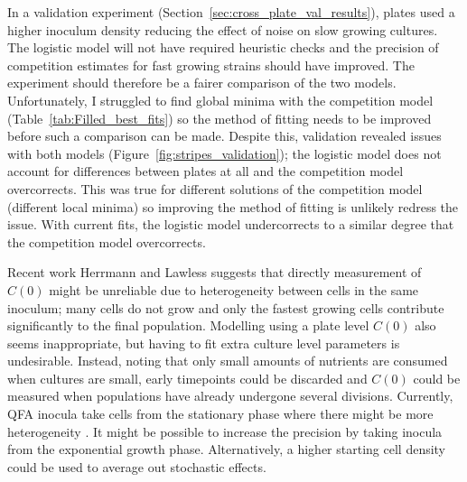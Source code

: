 In a validation experiment
(Section~\ref{sec:cross_plate_val_results}), plates used a higher
inoculum density reducing the effect of noise on slow growing
cultures. The logistic model will not have required heuristic checks
and the precision of competition estimates for fast growing strains
should have improved. The experiment should therefore be a fairer
comparison of the two models. Unfortunately, I struggled to find
global minima with the competition model
(Table~\ref{tab:Filled_best_fits}) so the method of fitting needs to
be improved before such a comparison can be made. Despite this,
validation revealed issues with both models
(Figure~\ref{fig:stripes_validation}); the logistic model does not
account for differences between plates at all and the competition
model overcorrects. This was true for different solutions of the
competition model (different local minima) so improving the method of
fitting is unlikely redress the issue. With current fits, the logistic
model undercorrects to a similar degree that the competition model
overcorrects.


Recent work Herrmann and Lawless suggests that directly measurement of
\(C(0)\) might be unreliable due to heterogeneity between cells in the
same inoculum; many cells do not grow and only the fastest growing
cells contribute significantly to the final population. Modelling
using a plate level \(C(0)\) also seems inappropriate, but having to
fit extra culture level parameters is undesirable. Instead, noting
that only small amounts of nutrients are consumed when cultures are
small, early timepoints could be discarded and \(C(0)\) could be
measured when populations have already undergone several
divisions. Currently, QFA inocula take cells from the stationary phase
where there might be more heterogeneity \citep{bergkessel2016}. It
might be possible to increase the precision by taking inocula from the
exponential growth phase. Alternatively, a higher starting cell
density could be used to average out stochastic effects.




